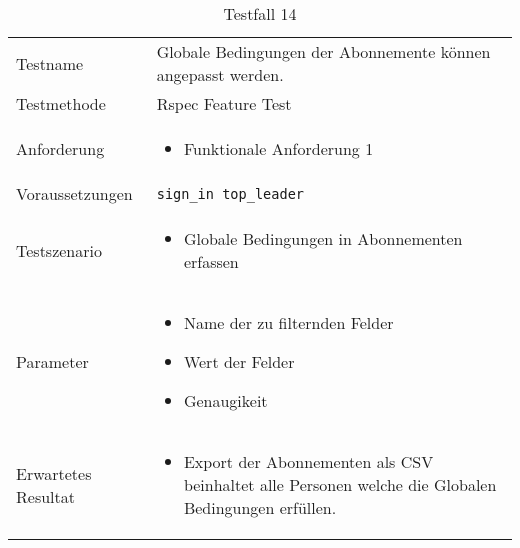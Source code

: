 \begin{table}[h!]
   \begin{tabular}{|L{0.4\textwidth}|L{0.6\textwidth}|}
       \hline
         \\[12pt]
       \hline
        Testname & Globale Bedingungen der Abonnemente können angepasst werden. \\
       \hline
       Testmethode & Rspec Feature Test \\
       \hline
        Anforderung & 
        \begin{itemize}
         \item Funktionale Anforderung 1
         \end{itemize}  \\
       \hline
       Voraussetzungen & \texttt{sign\_in top\_leader} \\
       \hline
       Testszenario & 
       \begin{itemize}
         \item Globale Bedingungen in Abonnementen erfassen
       \end{itemize} \\
       \hline
       Parameter & \begin{itemize}
         \item Name der zu filternden Felder
         \item Wert der Felder
         \item Genaugikeit
       \end{itemize} \\
       \hline
       Erwartetes Resultat & 
       \begin{itemize}
         \item Export der Abonnementen als CSV beinhaltet alle Personen welche die Globalen Bedingungen erfüllen.
       \end{itemize} \\
     \hline
     \end{tabular}
     \caption{Testfall 14}
\end{table}

\newpage

